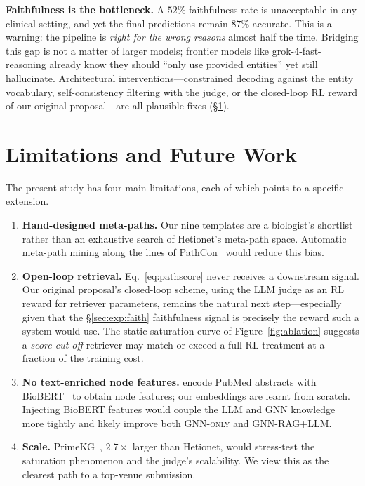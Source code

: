 \documentclass{article}
\newcommand{\ours}{\textsc{GNN-RAG+LLM}\xspace}
\newcommand{\gnno}{\textsc{GNN-only}\xspace}
\begin{document}
\textbf{Faithfulness is the bottleneck.} A $52\%$ faithfulness rate is unacceptable in any clinical setting, and yet the final predictions remain $87\%$ accurate. This is a warning: the pipeline is \emph{right for the wrong reasons} almost half the time. Bridging this gap is not a matter of larger models; frontier models like grok-4-fast-reasoning already know they should ``only use provided entities'' yet still hallucinate. Architectural interventions---constrained decoding against the entity vocabulary, self-consistency filtering with the judge, or the closed-loop RL reward of our original proposal---are all plausible fixes (\S\ref{sec:fut}).

\section{Limitations and Future Work}
\label{sec:fut}

The present study has four main limitations, each of which points to a specific extension.

\begin{enumerate}[label=(\roman*)]
    \item \textbf{Hand-designed meta-paths.} Our nine templates are a biologist's shortlist rather than an exhaustive search of Hetionet's meta-path space. Automatic meta-path mining along the lines of PathCon~\citep{wang2021pathcon} would reduce this bias.
    \item \textbf{Open-loop retrieval.} Eq.~\eqref{eq:pathscore} never receives a downstream signal. Our original proposal's closed-loop scheme, using the LLM judge as an RL reward for retriever parameters, remains the natural next step---especially given that the \S\ref{sec:exp:faith} faithfulness signal is precisely the reward such a system would use. The static saturation curve of Figure~\ref{fig:ablation} suggests a \emph{score cut-off} retriever may match or exceed a full RL treatment at a fraction of the training cost.
    \item \textbf{No text-enriched node features.} \citet{hays2026raggnn} encode PubMed abstracts with BioBERT~\citep{lee2020biobert} to obtain node features; our embeddings are learnt from scratch. Injecting BioBERT features would couple the LLM and GNN knowledge more tightly and likely improve both \gnno and \ours.
    \item \textbf{Scale.} PrimeKG~\citep{chandak2022primekg}, $2.7\times$ larger than Hetionet, would stress-test the saturation phenomenon and the judge's scalability. We view this as the clearest path to a top-venue submission.
\end{enumerate}
\end{document}
